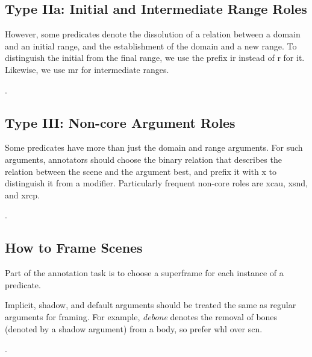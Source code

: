 \documentclass[a4paper]{article}
\begin{document}
\subsection{Type IIa: Initial and Intermediate Range Roles}

However, some predicates denote the dissolution of a relation between a domain and an initial range, and the establishment of the domain and a new range. To distinguish the initial from the final range, we use the prefix \textsf{ir} instead of \textsf{r} for it. Likewise, we use \textsf{mr} for intermediate ranges.

\ex. \\

\subsection{Type III: Non-core Argument Roles}

Some predicates have more than just the domain and range arguments. For such arguments, annotators should choose the binary relation that describes the relation between the scene and the argument best, and prefix it with \textsf{x} to distinguish it from a modifier. Particularly frequent non-core roles are \textsf{xcau}, \textsf{xsnd}, and \textsf{xrcp}.

\ex. 
     \\

\subsection{How to Frame Scenes}

Part of the annotation task is to choose a superframe for each instance of a predicate.

Implicit, shadow, and default arguments \citep{di-fabio-etal-2019-verbatlas} should
be treated the same as regular arguments for framing. For example,
\emph{debone} denotes the removal of bones (denoted by a shadow argument) from
a body, so prefer \textsf{whl} over \textsf{scn}.

\ex. 
\end{document}
